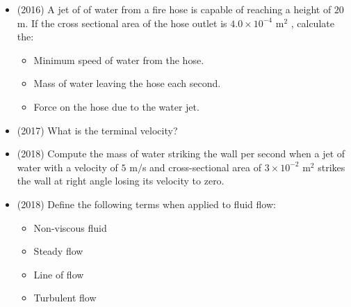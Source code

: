 \documentclass{article}
\begin{document}
\begin{itemize}
\item (2016)   A jet of of water from a fire hose is capable of reaching a height of $ 20$ m.  If the cross sectional area of the hose outlet is $ 4.0	\times 10^{-4}$ m$ ^{2}$ , calculate the:\begin{itemize}
\item Minimum speed of water from the hose.
\item Mass of water leaving the hose each second.
\item Force on the hose due to the water jet.
\end{itemize}
\item (2017)  What is the terminal velocity?
\item (2018)  Compute the mass of water striking the wall per second when a jet of water with a velocity of $ 5$ m$/$s and cross-sectional area of $ 3 \times 10^{-2}$ m$ ^{2}$ strikes the wall at right angle losing its velocity to zero. 
\item (2018)  Define the following terms when applied to fluid flow:\begin{itemize}
\item Non-viscous fluid 
\item Steady flow 
\item Line of flow 
\item Turbulent flow
\end{itemize}
\end{itemize}
\end{document}
